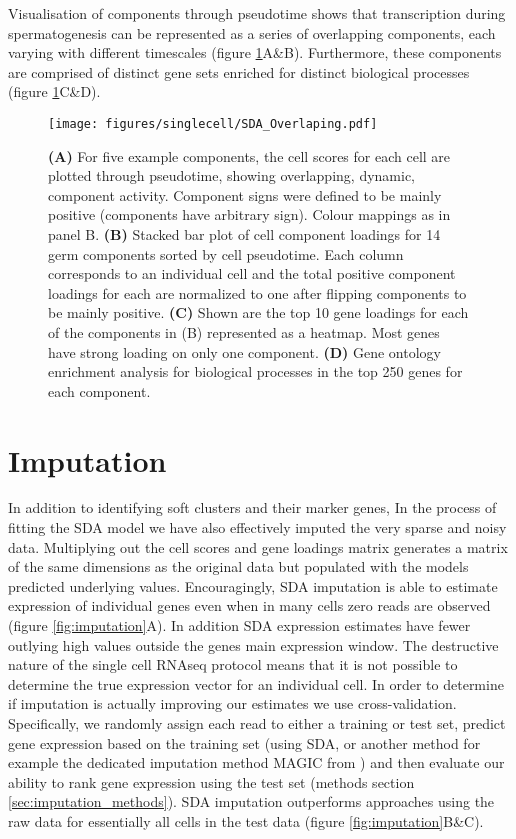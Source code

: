 Visualisation of components through pseudotime shows that transcription during spermatogenesis can be represented as a series of overlapping components, each varying with different timescales (figure \ref{fig:SDA_overlapping}A\&B). Furthermore, these components are comprised of distinct gene sets enriched for distinct biological processes (figure \ref{fig:SDA_overlapping}C\&D).

\begin{figure}[H]
	\centering
	\texttt{[image: figures/singlecell/SDA\_Overlaping.pdf]}
	\caption[Overlapping SDA Components]{
		\textbf{(A)} For five example components, the cell scores for each cell are plotted through pseudotime, showing overlapping, dynamic, component activity. Component signs were defined to be mainly positive (components have arbitrary sign). Colour mappings as in panel B.
		\textbf{(B)} Stacked bar plot of cell component loadings for 14 germ components sorted by cell pseudotime. Each column corresponds to an individual cell and the total positive component loadings for each are normalized to one after flipping components to be mainly positive.
		\textbf{(C)} Shown are the top 10 gene loadings for each of the components in (B) represented as a heatmap. Most genes have strong loading on only one component.
		\textbf{(D)} Gene ontology enrichment analysis for biological processes in the top 250 genes for each component.}
	\label{fig:SDA_overlapping}
\end{figure}


\section{Imputation}

In addition to identifying soft clusters and their marker genes, In the process of fitting the SDA model we have also effectively imputed the very sparse and noisy data. Multiplying out the cell scores and gene loadings matrix generates a matrix of the same dimensions as the original data but populated with the models predicted underlying values. Encouragingly, SDA imputation is able to estimate expression of individual genes even when in many cells zero reads are observed (figure \ref{fig:imputation}A). In addition SDA expression estimates have fewer outlying high values outside the genes main expression window. The destructive nature of the single cell RNAseq protocol means that it is not possible to determine the true expression vector for an individual cell. In order to determine if imputation is actually improving our estimates we use cross-validation. Specifically, we randomly assign each read to either a training or test set, predict gene expression based on the training set (using SDA, or another method for example the dedicated imputation method MAGIC from \cite{vanDijk2018Recovering}) and then evaluate our ability to rank gene expression using the test set (methods section \ref{sec:imputation_methods}). SDA imputation outperforms approaches using the raw data for essentially all cells in the test data (figure \ref{fig:imputation}B\&C).

